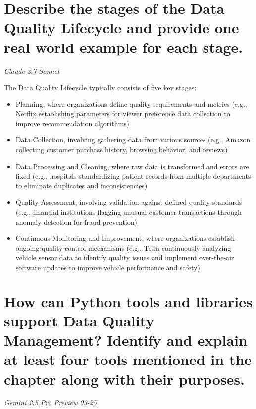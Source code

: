 \section{Describe the stages of the Data Quality Lifecycle and provide one real
world example for each stage.}

\textit{Claude-3.7-Sonnet}

The Data Quality Lifecycle typically consists of five key stages: 

\begin{itemize}

    \item Planning, where organizations define quality requirements and metrics (e.g., Netflix establishing parameters for viewer preference data collection to improve recommendation algorithms)
    \item Data Collection, involving gathering data from various sources (e.g., Amazon collecting customer purchase history, browsing behavior, and reviews)
    \item Data Processing and Cleaning, where raw data is transformed and errors are fixed (e.g., hospitals standardizing patient records from multiple departments to eliminate duplicates and inconsistencies)
    \item Quality Assessment, involving validation against defined quality standards (e.g., financial institutions flagging unusual customer transactions through anomaly detection for fraud prevention)
    \item Continuous Monitoring and Improvement, where organizations establish ongoing quality control mechanisms (e.g., Tesla continuously analyzing vehicle sensor data to identify quality issues and implement over-the-air software updates to improve vehicle performance and safety)

\end{itemize}

\section{How can Python tools and libraries support Data Quality Management? 
Identify and explain at least four tools mentioned in the chapter along 
with their purposes.}

\textit{Gemini 2.5 Pro Preview 03-25}

